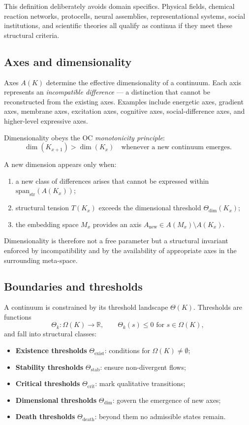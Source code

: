 This definition deliberately avoids domain specifics.  
Physical fields, chemical reaction networks, protocells, neural assemblies, representational systems, social institutions, and scientific theories all qualify as continua if they meet these structural criteria.

\subsection{Axes and dimensionality}

Axes \(A(K)\) determine the effective dimensionality of a continuum.  
Each axis represents an \emph{incompatible difference} — a distinction that cannot be reconstructed from the existing axes.  
Examples include energetic axes, gradient axes, membrane axes, excitation axes, cognitive axes, social-difference axes, and higher-level expressive axes.

Dimensionality obeys the OC \emph{monotonicity principle}:
\[
\dim(K_{x+1}) > \dim(K_x)
\quad\text{whenever a new continuum emerges}.
\]

A new dimension appears only when:

\begin{enumerate}
    \item a new class of differences arises that cannot be expressed within
          \(\mathrm{span}_{\mathrm{str}}(A(K_x))\);
    \item structural tension \(T(K_x)\) exceeds the dimensional threshold \(\Theta_{\mathrm{dim}}(K_x)\);
    \item the embedding space \(M_x\) provides an axis \(A_{\mathrm{new}}\in A(M_x)\setminus A(K_x)\).
\end{enumerate}

Dimensionality is therefore not a free parameter but a structural invariant enforced by incompatibility and by the availability of appropriate axes in the surrounding meta-space.

\subsection{Boundaries and thresholds}

A continuum is constrained by its threshold landscape \(\Theta(K)\).  
Thresholds are functions
\[
\Theta_k : \Omega(K) \to \mathbb{R},
\qquad
\Theta_k(s)\le 0 \text{ for } s\in\Omega(K),
\]
and fall into structural classes:

\begin{itemize}
    \item \textbf{Existence thresholds} \(\Theta_{\mathrm{exist}}\): conditions for \(\Omega(K)\neq\emptyset\);
    \item \textbf{Stability thresholds} \(\Theta_{\mathrm{stab}}\): ensure non-divergent flows;
    \item \textbf{Critical thresholds} \(\Theta_{\mathrm{crit}}\): mark qualitative transitions;
    \item \textbf{Dimensional thresholds} \(\Theta_{\mathrm{dim}}\): govern the emergence of new axes;
    \item \textbf{Death thresholds} \(\Theta_{\mathrm{death}}\): beyond them no admissible states remain.
\end{itemize}


